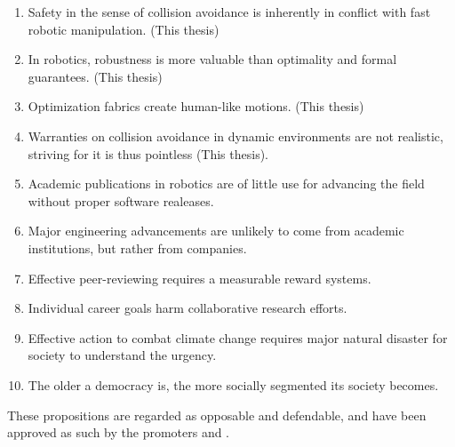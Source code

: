 \documentclass[nativefonts]{src/TUD-dissertation2020}
\begin{document}
\begin{enumerate}

  \item Safety in the sense of collision avoidance is inherently in conflict
    with fast robotic manipulation. (This thesis)
  \item In robotics, robustness is more valuable than optimality and formal
    guarantees. (This thesis)
  \item Optimization fabrics create human-like motions. (This thesis)
  \item Warranties on collision avoidance in dynamic environments are not
    realistic, striving for it is thus pointless (This thesis).
  \item Academic publications in robotics are of little use for advancing the
    field without proper software realeases.
  \item Major engineering advancements are unlikely to come from academic
    institutions, but rather from companies.
  \item Effective peer-reviewing requires a measurable reward systems.
  \item Individual career goals harm collaborative research efforts.
  \item Effective action to combat climate change requires major natural disaster
    for society to understand the urgency.
  \item The older a democracy is, the more socially
    segmented its society becomes.
\end{enumerate}

\bigskip
\bigskip

\begin{center}
These propositions are regarded as opposable and defendable, and have been
  approved as such by the promoters \promotor{} and \copromotor{}.
\end{center}

\clearpage
\end{document}

